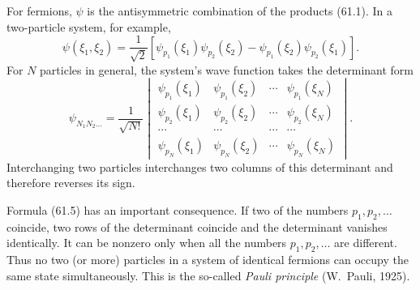 For fermions, $\psi$ is the antisymmetric combination of the products (61.1). In a two-particle system, for example,
\begin{equation}
 \psi(\xi_1,\xi_2)=\frac1{\sqrt2}\left[\psi_{p_1}(\xi_1)\psi_{p_2}(\xi_2)-\psi_{p_1}(\xi_2)\psi_{p_2}(\xi_1)\right].
 \tag{61.4}
\end{equation}
For $N$ particles in general, the system's wave function takes the determinant form
\begin{equation}
 \psi_{N_1N_2\ldots}=\frac1{\sqrt{N!}}
 \begin{vmatrix}
  \psi_{p_1}(\xi_1)&\psi_{p_1}(\xi_2)&\cdots&\psi_{p_1}(\xi_N)\\
  \psi_{p_2}(\xi_1)&\psi_{p_2}(\xi_2)&\cdots&\psi_{p_2}(\xi_N)\\
  \cdots&\cdots&\cdots&\cdots\\
  \psi_{p_N}(\xi_1)&\psi_{p_N}(\xi_2)&\cdots&\psi_{p_N}(\xi_N)
 \end{vmatrix}.
 \tag{61.5}
\end{equation}
Interchanging two particles interchanges two columns of this determinant and therefore reverses its sign.

Formula (61.5) has an important consequence. If two of the numbers $p_1,p_2,\ldots$ coincide, two rows of the determinant coincide and the determinant vanishes identically. It can be nonzero only when all the numbers $p_1,p_2,\ldots$ are different. Thus no two (or more) particles in a system of identical fermions can occupy the same state simultaneously. This is the so-called \emph{Pauli principle} (W.~Pauli, 1925).
